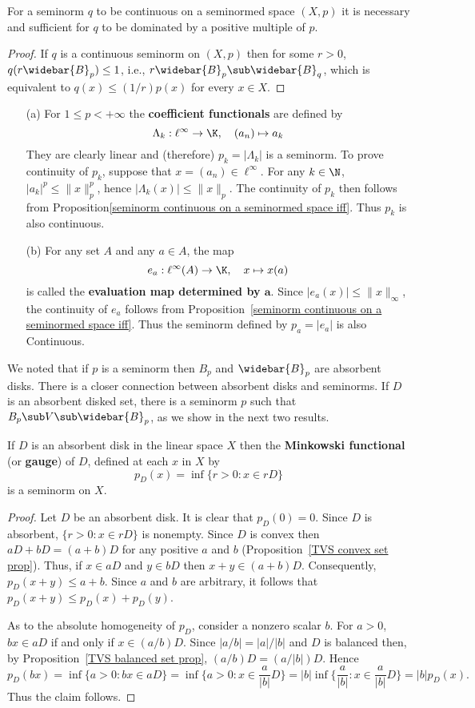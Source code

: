 \begin{proposition}\label{seminorm continuous on a seminormed space iff}
For a seminorm $q$ to be continuous on a seminormed space $(X,p)$ it is necessary and sufficient for $q$ to be dominated by a positive multiple of $p$.
\end{proposition}
\begin{proof}
If $q$ is a continuous seminorm on $(X,p)$ then for some $r>0$, $q(r\widebar{B}_p)\leq 1$, i.e., $r\widebar{B}_p\sub\widebar{B}_q$, which is equivalent to $q(x)\leq(1/r)p(x)$ for every $x\in X$.
\end{proof}
\begin{example}\label{seminorm space continuity eg}
\mbox{}
\begin{itemize}
\item[(a)] For $1\leq p<+\infty$ the \textbf{coefficient functionals} are defined by
\[\Lambda_k:\ell^\infty\to\K,\quad (a_n)\mapsto a_k\]
They are clearly linear and (therefore) $p_k=|\Lambda_k|$ is a seminorm. To prove continuity of $p_k$, suppose that $x=(a_n)\in\ell^\infty$. For any $k\in\N$, $|a_k|^p\leq\|x\|_p^p$, hence $|\Lambda_k(x)|\leq\|x\|_p$. The continuity of $p_k$ then follows from Proposition\ref{seminorm continuous on a seminormed space iff}. Thus $p_k$ is also continuous.
\item[(b)] For any set $A$ and any $a\in A$, the map
\[e_a:\ell^\infty(A)\to\K,\quad x\mapsto x(a)\]
is called the \textbf{evaluation map determined by $\bm{a}$}. Since $|e_a(x)|\leq\|x\|_\infty$, the continuity of $e_a$ follows from Proposition~\ref{seminorm continuous on a seminormed space iff}. Thus the seminorm defined by $p_a=|e_a|$ is also Continuous.
\end{itemize}
\end{example}
We noted that if $p$ is a seminorm then $B_p$ and $\widebar{B}_p$ are absorbent disks. There is a closer connection between absorbent disks and seminorms. If $D$ is an absorbent disked set, there is a seminorm $p$ such that $B_p\sub V\sub\widebar{B}_p$, as we show in the next two results.
\begin{theorem}\label{Minkowski functional}
If $D$ is an absorbent disk in the linear space $X$ then the \textbf{Minkowski functional} (or \textbf{gauge}) of $D$, defined at each $x$ in $X$ by
\[p_D(x)=\inf\{r>0:x\in rD\}\]
is a seminorm on $X$.
\end{theorem}
\begin{proof}
Let $D$ be an absorbent disk. It is clear that $p_D(0)=0$. Since $D$ is absorbent, $\{r>0:x\in rD\}$ is nonempty. Since $D$ is convex then $aD+bD=(a+b)D$ for any positive $a$ and $b$ (Proposition~\ref{TVS convex set prop}). Thus, if $x\in aD$ and $y\in bD$ then $x+y\in (a+b)D$. Consequently, $p_D(x+y)\leq a+b$. Since $a$ and $b$ are arbitrary, it follows that $p_D(x+y)\leq p_D(x)+p_D(y)$.\par
As to the absolute homogeneity of $p_D$, consider a nonzero scalar $b$. For $a>0$, $bx\in aD$ if and only if $x\in (a/b)D$. Since $|a/b|=|a|/|b|$ and $D$ is balanced then, by Proposition~\ref{TVS balanced set prop}, $(a/b)D=(a/|b|)D$. Hence
\[p_D(bx)=\inf\{a>0:bx\in aD\}=\inf\{a>0:x\in\frac{a}{|b|}D\}=|b|\inf\{\frac{a}{|b|}:x\in\frac{a}{|b|}D\}=|b|p_D(x).\]
Thus the claim follows.
\end{proof}
